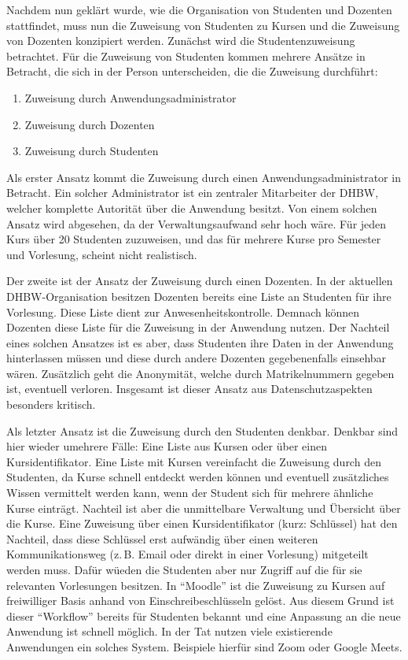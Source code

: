 Nachdem nun geklärt wurde, wie die Organisation von Studenten und Dozenten stattfindet, muss nun die Zuweisung von Studenten zu Kursen und die Zuweisung von Dozenten konzipiert werden.
Zunächst wird die Studentenzuweisung betrachtet.
Für die Zuweisung von Studenten kommen mehrere Ansätze in Betracht, die sich in der Person unterscheiden, die die Zuweisung durchführt:
\begin{enumerate}
    \item Zuweisung durch Anwendungsadministrator
    \item Zuweisung durch Dozenten
    \item Zuweisung durch Studenten
\end{enumerate}
Als erster Ansatz kommt die Zuweisung durch einen Anwendungsadministrator in Betracht.
Ein solcher Administrator ist ein zentraler Mitarbeiter der DHBW, welcher komplette Autorität über die Anwendung besitzt.
Von einem solchen Ansatz wird abgesehen, da der Verwaltungsaufwand sehr hoch wäre.
Für jeden Kurs über 20 Studenten zuzuweisen, und das für mehrere Kurse pro Semester und Vorlesung, scheint nicht realistisch.

Der zweite ist der Ansatz der Zuweisung durch einen Dozenten.
In der aktuellen DHBW-Organisation besitzen Dozenten bereits eine Liste an Studenten für ihre Vorlesung.
Diese Liste dient zur Anwesenheitskontrolle.
Demnach können Dozenten diese Liste für die Zuweisung in der Anwendung nutzen.
Der Nachteil eines solchen Ansatzes ist es aber, dass Studenten ihre Daten in der Anwendung hinterlassen müssen und diese durch andere Dozenten gegebenenfalls einsehbar wären.
Zusätzlich geht die Anonymität, welche durch Matrikelnummern gegeben ist, eventuell verloren.
Insgesamt ist dieser Ansatz aus Datenschutzaspekten besonders kritisch. 

Als letzter Ansatz ist die Zuweisung durch den Studenten denkbar.
Denkbar sind hier wieder umehrere Fälle: Eine Liste aus Kursen oder über einen Kursidentifikator.
Eine Liste mit Kursen vereinfacht die Zuweisung durch den Studenten, da Kurse schnell entdeckt werden können und eventuell zusätzliches Wissen vermittelt werden kann, wenn der Student sich für mehrere ähnliche Kurse einträgt.
Nachteil ist aber die unmittelbare Verwaltung und Übersicht über die Kurse.
Eine Zuweisung über einen Kursidentifikator (kurz: Schlüssel) hat den Nachteil, dass diese Schlüssel erst aufwändig über einen weiteren Kommunikationsweg (z.\,B. Email oder direkt in einer Vorlesung) mitgeteilt werden muss.
Dafür wüeden die  Studenten aber nur Zugriff auf die für sie relevanten Vorlesungen besitzen.
In \enquote{Moodle} ist die Zuweisung zu Kursen auf freiwilliger Basis anhand von Einschreibeschlüsseln gelöst.
Aus diesem Grund ist dieser \enquote{Workflow} bereits für Studenten bekannt und eine Anpassung an die neue Anwendung ist schnell möglich.
In der Tat nutzen viele existierende Anwendungen ein solches System.
Beispiele hierfür sind Zoom oder Google Meets.


